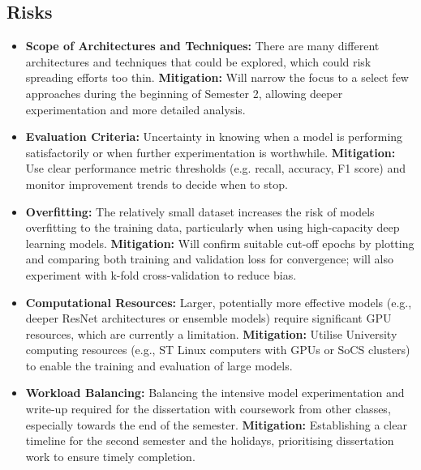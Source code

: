 \documentclass[11pt]{article}
\begin{document}
\subsection*{Risks}\label{risks}
\begin{itemize}
    \tightlist
    \item \textbf{Scope of Architectures and Techniques:} There are many different architectures and techniques that could be explored, which could risk spreading efforts too thin. \textbf{Mitigation:} Will narrow the focus to a select few approaches during the beginning of Semester 2, allowing deeper experimentation and more detailed analysis.
    \item \textbf{Evaluation Criteria:} Uncertainty in knowing when a model is performing satisfactorily or when further experimentation is worthwhile. \textbf{Mitigation:} Use clear performance metric thresholds (e.g. recall, accuracy, F1 score) and monitor improvement trends to decide when to stop.
    \item \textbf{Overfitting:} The relatively small dataset increases the risk of models overfitting to the training data, particularly when using high-capacity deep learning models. \textbf{Mitigation:} Will confirm suitable cut-off epochs by plotting and comparing both training and validation loss for convergence; will also experiment with k-fold cross-validation to reduce bias.
    \item \textbf{Computational Resources:} Larger, potentially more effective models (e.g., deeper ResNet architectures or ensemble models) require significant GPU resources, which are currently a limitation. \textbf{Mitigation:} Utilise University computing resources (e.g., ST Linux computers with GPUs or SoCS clusters) to enable the training and evaluation of large models.
    \item \textbf{Workload Balancing:} Balancing the intensive model experimentation and write-up required for the dissertation with coursework from other classes, especially towards the end of the semester. \textbf{Mitigation:} Establishing a clear timeline for the second semester and the holidays, prioritising dissertation work to ensure timely completion.
\end{itemize}
    
\end{document}
